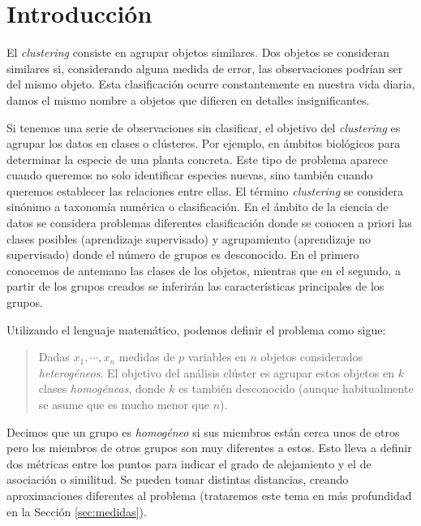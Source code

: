 \documentclass[a4paper, 20pt]{article}
\begin{document}
{\parskip=2pt
  \tableofcontents
}
\pagebreak

\section{Introducción}

El \textit{clustering} consiste en agrupar objetos similares. Dos objetos se consideran similares si, considerando alguna medida de error, las observaciones podrían ser del mismo objeto. Esta clasificación ocurre constantemente en nuestra vida diaria, damos el mismo nombre a objetos que difieren en detalles insignificantes. 


Si tenemos una serie de observaciones sin clasificar, el objetivo del \textit{clustering} es agrupar los datos en clases o clústeres. Por ejemplo, en ámbitos biológicos para determinar la especie de una planta concreta. Este tipo de problema aparece cuando queremos no solo identificar especies nuevas, sino también cuando queremos establecer las relaciones entre ellas. El término \textit{clustering} se considera sinónimo a taxonomía numérica o clasificación. En el ámbito de la ciencia de datos se considera problemas diferentes clasificación donde se conocen a priori las clases posibles (aprendizaje supervisado) y agrupamiento (aprendizaje no supervisado) donde el número de grupos es desconocido. En el primero conocemos de antemano las clases de los objetos, mientras que en el segundo, a partir de los grupos creados se inferirán las características principales de los grupos.

Utilizando el lenguaje matemático, podemos definir el problema como sigue:

\begin{quote}
  Dadas \textbf{$x_1$}$,\cdots, $\textbf{$x_n$} medidas de $p$ variables en $n$ objetos considerados \textit{heterogéneos}. El objetivo del análisis clúster es agrupar estos objetos en $k$ clases \textit{homogéneas}, donde $k$ es también desconocido (aunque habitualmente se asume que es mucho menor que $n$).
\end{quote}

Decimos que un grupo es \textit{homogéneo} si sus miembros están cerca unos de otros pero los miembros de otros grupos son muy diferentes a estos. Esto lleva a definir dos métricas entre los puntos para indicar el grado de alejamiento y el de asociación o similitud. Se pueden tomar distintas distancias, creando aproximaciones diferentes al problema (trataremos este tema en más profundidad en la Sección \ref{sec:medidas}).
\end{document}
